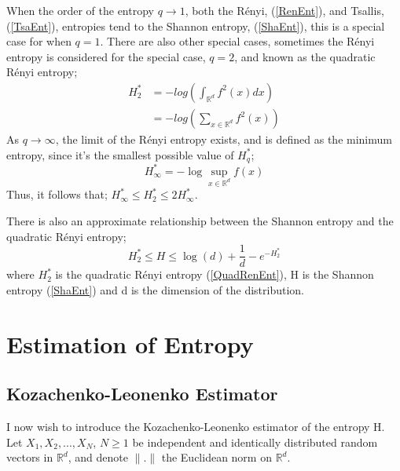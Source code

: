 \documentclass{article}
\begin{document}
When the order of the entropy $q \to 1$, both the R\'enyi, (\ref{RenEnt}), and Tsallis, (\ref{TsaEnt}), entropies tend to the Shannon entropy, (\ref{ShaEnt}), this is a special case for when $q=1$. There are also other special cases, sometimes the R\'enyi entropy is considered for the special case, $q=2$, and known as the quadratic R\'enyi entropy;
\begin{align} 
H_{2}^{*} &= - log\left( \int_{\mathbb{R}^{d}} f^2(x) dx \right) \label{QuadRenEnt} \\
&= - log \left( \sum_{x \in \mathbb{R}^d} f^2 (x) \right) \nonumber 
\end{align}
As $q \to \infty$, the limit of the R\'enyi entropy exists, and is defined as the minimum entropy, since it's the smallest possible value of $H_{q}^{*}$;
\begin{equation}
H_{\infty}^{*} = - \log \sup_{x \in \mathbb{R}^d} f (x) \nonumber
\end{equation}
Thus, it follows that; $H_{\infty}^{*} \leq H_{2}^{*} \leq 2H_{\infty}^{*}$.

There is also an approximate relationship between the Shannon entropy and the quadratic R\'enyi entropy;
\begin{equation}
H_{2}^{*} \leq H \leq \log(d) + \frac{1}{d} - e^{-H_{2}^{*}} \nonumber
\end{equation}
where $H_{2}^{*}$ is the quadratic R\'enyi entropy (\ref{QuadRenEnt}), H is the Shannon entropy (\ref{ShaEnt}) and d is the dimension of the distribution.

\section{Estimation of Entropy}

\subsection{Kozachenko-Leonenko Estimator}

I now wish to introduce the Kozachenko-Leonenko estimator of the entropy H. Let $X_{1}, X_{2}, ... ,X_{N}$, $N \geq 1$ be independent and identically distributed random vectors in $\mathbb{R}^{d}$, and denote $\|.\|$ the Euclidean norm on $\mathbb{R}^{d}$.
 
\end{document}
